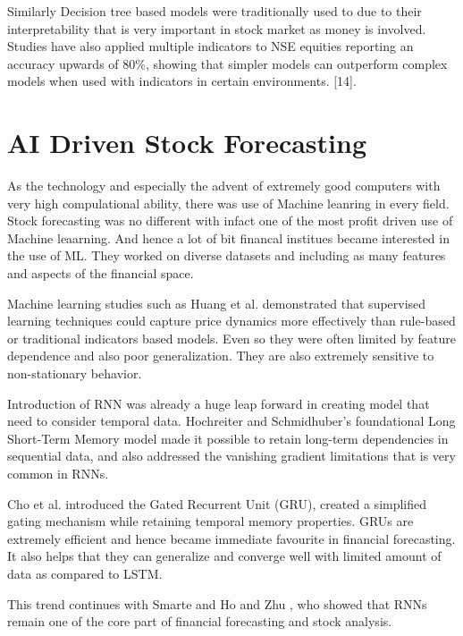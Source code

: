 Similarly Decision tree based models were traditionally used to due to their interpretability that is very important in stock market as money is involved. Studies have also applied multiple indicators to NSE equities reporting an accuracy upwards of 80\%, showing that simpler models can outperform complex models when used with indicators in certain environments. [14].

\section{AI Driven Stock Forecasting}

As the technology and especially the advent of extremely good computers with very high compulational ability, there was use of Machine leanring in every field. Stock forecasting was no different with infact one of the most profit driven use of Machine leaarning. And hence a lot of bit financal institues became interested in the use of ML. They worked on diverse datasets and including as many features and aspects of the financial space.

Machine learning studies such as Huang et al. \cite{Huang2022PredictiveModeling} demonstrated that supervised learning techniques could capture price dynamics more effectively than rule-based or traditional indicators based models. Even so they were often limited by feature dependence and also poor generalization. They are also extremely sensitive to non-stationary behavior.


Introduction of RNN was already a huge leap forward in creating model that need to consider temporal data. Hochreiter and Schmidhuber's foundational Long Short-Term Memory model \cite{Hochreiter1997LSTM} made it possible to retain long-term dependencies in sequential data, and also addressed the vanishing gradient limitations that is very common in RNNs.

Cho et al. \cite{Cho2014GRU} introduced the Gated Recurrent Unit (GRU), created a simplified gating mechanism while retaining temporal memory properties. GRUs are extremely efficient and hence became immediate favourite in financial forecasting. It also helps that they can generalize and converge well with limited amount of data as compared to LSTM.

This trend continues with Smarte and Ho \cite{Smarte2021ReviewOfMachineLearning} and Zhu \cite{Zhu2025StockPredictionReview}, who showed that RNNs remain one of the core part of financial forecasting and stock analysis.

